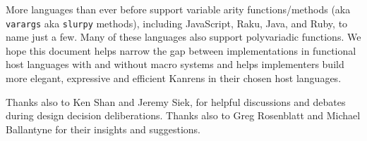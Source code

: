 \documentclass[sigplan,screen,draft,anonymous,review,natbib=false]{acmart}
\begin{document}
More languages than ever before support variable arity
functions/methods (aka \verb|varargs| aka \verb|slurpy| methods),
including JavaScript, Raku, Java, and Ruby, to name just a few. Many
of these languages also support polyvariadic functions. We hope this
document helps narrow the gap between implementations in functional
host languages with and without macro systems and helps implementers
build more elegant, expressive and efficient Kanrens in their chosen
host languages.

\begin{acks}

  Thanks also to Ken Shan and Jeremy Siek, for helpful discussions and
  debates during design decision deliberations. Thanks also to Greg
  Rosenblatt and Michael Ballantyne for their insights and
  suggestions.

\end{acks}

\printbibliography{}
\end{document}
